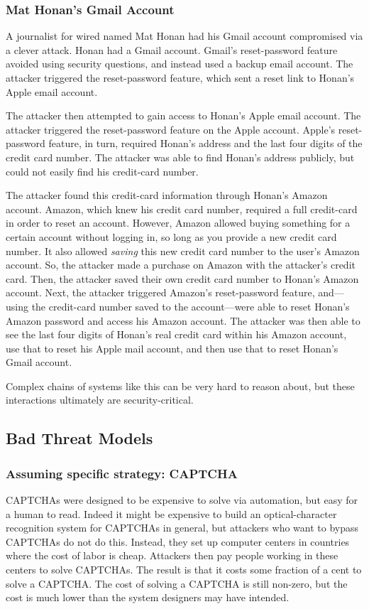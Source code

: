 \subsubsection{Mat Honan's Gmail Account}
A journalist for wired named Mat Honan had his Gmail account compromised via a clever attack.\cite{honan}
Honan had a Gmail account.
Gmail's reset-password feature avoided using security questions, and instead used a backup email account.
The attacker triggered the reset-password feature, which sent a reset link
to Honan's Apple email account.

The attacker then attempted to gain access to Honan's Apple email account.
The attacker triggered the reset-password feature on the Apple account.
Apple's reset-password feature, in turn, required Honan's address and the last four digits of the credit card number.
The attacker was able to find Honan's address publicly, but could not easily find his credit-card number.

The attacker found this credit-card information through Honan's Amazon account.
Amazon, which knew his credit card number, required a full credit-card in order to reset an account.
However, Amazon allowed buying something for a certain account without logging in, 
so long as you provide a new credit card number.
It also allowed \textit{saving} this new credit card number to the user's Amazon account.
So, the attacker made a purchase on Amazon with the attacker's credit card.
Then, the attacker saved their own credit card number to Honan's Amazon account.
Next, the attacker triggered Amazon's reset-password feature, and---using the credit-card
number saved to the account---were able to reset Honan's 
Amazon password and access his Amazon account.
The attacker was then able to see the last four
digits of Honan's real credit card within his
Amazon account, use that to reset his Apple mail
account, and then use that to reset Honan's Gmail
account.

Complex chains of systems like this can be very hard to reason about,
but these interactions ultimately are security-critical.

\subsection{Bad Threat Models}

\subsubsection{Assuming specific strategy: CAPTCHA}
CAPTCHAs were designed to be expensive to
solve via automation, but easy for a human to read.
Indeed it might be expensive to build an optical-character recognition 
system for CAPTCHAs in general, but attackers who want
to bypass CAPTCHAs do not do this.
Instead, they set up computer centers in countries where the cost of
labor is cheap. Attackers then pay people working in these 
centers to solve CAPTCHAs.
The result is that it costs some fraction of
a cent to solve a CAPTCHA. 
The cost of solving a CAPTCHA is still non-zero,
but the cost is much lower than the system designers
may have intended.

